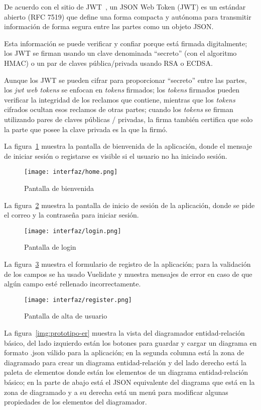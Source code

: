 De acuerdo con el sitio de JWT~\cite{jwt_web_2020}, un JSON Web Token (JWT) es un estándar abierto (RFC 7519) que define una forma compacta y autónoma para transmitir información de forma segura entre las partes como un objeto JSON.


Esta información se puede verificar y confiar porque está firmada digitalmente; los JWT se firman usando un clave denominada ``secreto'' (con el algoritmo HMAC) o un par de claves pública/privada usando RSA o ECDSA.

Aunque los JWT se pueden cifrar para proporcionar ``secreto'' entre las partes, los \textit{jwt web tokens} se enfocan en \textit{tokens} firmados; los \textit{tokens} firmados pueden verificar la integridad de los reclamos que contiene, mientras que los \textit{tokens} cifrados ocultan esos reclamos de otras partes; cuando los \textit{tokens} se firman utilizando pares de claves públicas / privadas, la firma también certifica que solo la parte que posee la clave privada es la que la firmó.


La figura~\ref{img:prototipo-welcome} muestra la pantalla de bienvenida de la aplicación, donde el mensaje de iniciar sesión o registarse es visible si el usuario no ha iniciado sesión.

\begin{figure}[H]
    \centering
    \texttt{[image: interfaz/home.png]}
    \caption{Pantalla de bienvenida}
    \label{img:prototipo-welcome}
\end{figure}

La figura~\ref{img:prototipo-login} muestra la pantalla de inicio de sesión de la aplicación, donde se pide el correo y la contraseña para iniciar sesión.


\begin{figure}[H]
    \centering
    \texttt{[image: interfaz/login.png]}
    \caption{Pantalla de login}
    \label{img:prototipo-login}
\end{figure}
La figura~\ref{img:prototipo-signup} muestra el formulario de registro de la aplicación; para la validación de los campos se ha usado Vuelidate y muestra mensajes de error en caso de que algún campo esté rellenado incorrectamente.


\begin{figure}[H]
    \centering
    \texttt{[image: interfaz/register.png]}
    \caption{Pantalla de alta de usuario}
    \label{img:prototipo-signup}
\end{figure}
La figura~\ref{img:prototipo-er} muestra la vista del diagramador entidad-relación básico, del lado izquierdo están los botones para guardar y cargar un diagrama en formato .json válido para la aplicación; en la segunda columna está la zona de diagramado para crear un diagrama entidad-relación y del lado derecho está la paleta de elementos donde están los elementos de un diagrama entidad-relación básico; en la parte de abajo está el JSON equivalente del diagrama que está en la zona de diagramado y a su derecha está un menú para modificar algunas propiedades de los elementos del diagramador.

